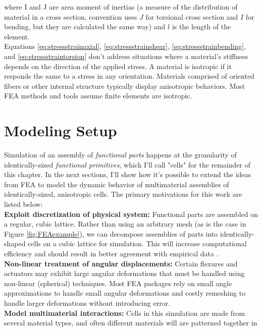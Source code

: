 {where I and J are area moment of inertias (a measure of the distribution of material in a cross section, convention uses $J$ for torsional cross section and $I$ for bending, but they are calculated the same way) and $l$ is the length of the element.\\

Equations \ref{eq:stressstrainaxial}, \ref{eq:stressstrainshear}, \ref{eq:stressstrainbending}, and \ref{eq:stressstraintorsion} don't address situations where a material's stiffness depends on the direction of the applied stress.  A material is isotropic if it responds the same to a stress in any orientation.  Materials comprised of oriented fibers or other internal structure typically display anisotropic behaviors.  Most FEA methods and tools assume finite elements are isotropic.

\section{Modeling Setup}

Simulation of an assembly of \textit{functional parts} happens at the granularity of identically-sized \textit{functional primitives}, which I'll call "cells" for the remainder of this chapter.  In the next sections, I'll show how it's possible to extend the ideas from FEA to model the dynamic behavior of multimaterial assemblies of identically-sized, anisotropic cells.  The primary motivations for this work are listed below:\\

\textbf{Exploit discretization of physical system:} Functional parts are assembled on a regular, cubic lattice.  Rather than using an arbitrary mesh (as is the case in Figure \ref{fig:FEAexample}), we can decompose assemblies of parts into identically-shaped cells on a cubic lattice for simulation.  This will increase computational efficiency and should result in better agreement with empirical data \cite{Calisch2014}.\\

\textbf{Non-linear treatment of angular displacements:} Certain flexures and actuators may exhibit large angular deformations that must be handled using non-linear (spherical) techniques.  Most FEA packages rely on small angle approximations to handle small angular deformations and costly remeshing to handle larger deformations without introducing error.\\

\textbf{Model multimaterial interactions:} Cells in this simulation are made from several material types, and often different materials will are patterned together in\\

}
